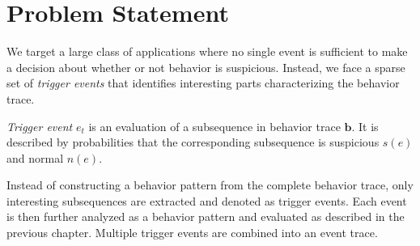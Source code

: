 %
%
%








\section{Problem Statement}
\label{sec:problem}

We target a large class of applications where no single event is sufficient to make a decision about whether or not behavior is suspicious. Instead, we face a sparse set of \emph{trigger events} that identifies interesting parts characterizing the behavior trace. 

\begin{definition}
	\emph{Trigger event} $e_t$ is an evaluation of a subsequence in behavior trace $\mathbf{b}$. 
	It is described by probabilities that the corresponding subsequence is suspicious $s(e)$ and normal $n(e)$.
\end{definition}
\noindent

Instead of constructing a behavior pattern from the complete behavior trace, only interesting subsequences are extracted and denoted as trigger events. Each event is then further analyzed as a behavior pattern and evaluated as described in the previous chapter. Multiple trigger events are combined into an event trace.

